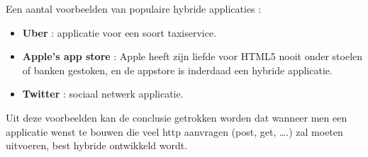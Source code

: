 Een aantal voorbeelden van populaire hybride applicaties : 

\begin{itemize}
	\item \textbf{Uber} : applicatie voor een soort taxiservice.
	\item \textbf{Apple's app store} : Apple heeft zijn liefde voor HTML5 nooit onder stoelen of banken gestoken, en de appstore is inderdaad een hybride applicatie.
	\item \textbf{Twitter} : sociaal netwerk applicatie.
\end{itemize}

Uit deze voorbeelden kan de conclusie getrokken worden dat wanneer men een applicatie wenst te bouwen die veel http aanvragen (post, get, ….) zal moeten uitvoeren, best hybride ontwikkeld wordt.
	
